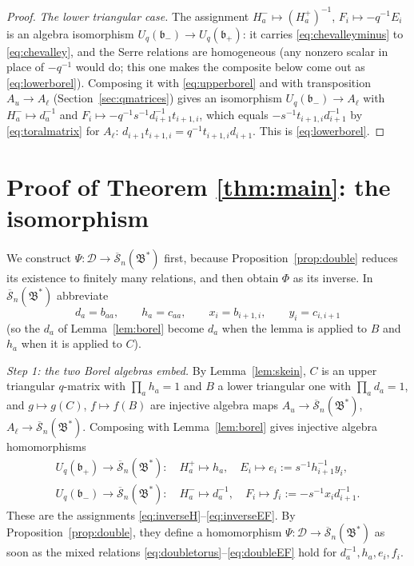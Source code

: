 \documentclass[12pt]{article}
\theoremstyle{remark}
\newcommand{\U}{U_q}
\newcommand{\bp}{\mathfrak b_+}
\newcommand{\bm}{\mathfrak b_-}
\newcommand{\redS}{\overline{\mathcal S}_n}
\newcommand{\Bstar}{\mathfrak B^*}
\newcommand{\cD}{\mathcal D}
\begin{document}
\begin{proof}
\emph{The lower triangular case.} The assignment
$H^-_a\mapsto(H^+_a)^{-1}$, $F_i\mapsto-q^{-1}E_i$
is an algebra isomorphism $\U(\bm)\to\U(\bp)$: it carries
\eqref{eq:chevalleyminus} to \eqref{eq:chevalley}, and the Serre
relations are homogeneous (any nonzero scalar in place of $-q^{-1}$
would do; this one makes the composite below come out as
\eqref{eq:lowerborel}). Composing it with \eqref{eq:upperborel} and
with transposition $A_u\to A_\ell$ (Section~\ref{sec:qmatrices}) gives
an isomorphism $\U(\bm)\to A_\ell$ with $H^-_a\mapsto d_a^{-1}$ and
$F_i\mapsto-q^{-1}s^{-1}d_{i+1}^{-1}t_{i+1,i}$, which equals
$-s^{-1}t_{i+1,i}d_{i+1}^{-1}$ by \eqref{eq:toralmatrix} for $A_\ell$:
$d_{i+1}t_{i+1,i}=q^{-1}t_{i+1,i}d_{i+1}$. This is
\eqref{eq:lowerborel}.
\end{proof}

\section{Proof of Theorem \ref{thm:main}: the isomorphism}\label{sec:proof}

We construct $\Psi:\cD\to\redS(\Bstar)$ first, because
Proposition~\ref{prop:double} reduces its existence to finitely many
relations, and then obtain $\Phi$ as its inverse. In $\redS(\Bstar)$
abbreviate
\[
 d_a=b_{aa},\qquad h_a=c_{aa},\qquad
 x_i=b_{i+1,i},\qquad y_i=c_{i,i+1}
\]
(so the $d_a$ of Lemma~\ref{lem:borel} become $d_a$ when the lemma is
applied to $B$ and $h_a$ when it is applied to $C$).

\emph{Step 1: the two Borel algebras embed.} By Lemma~\ref{lem:skein},
$C$ is an upper triangular $q$-matrix with $\prod_ah_a=1$ and $B$ a
lower triangular one with $\prod_ad_a=1$, and $g\mapsto g(C)$,
$f\mapsto f(B)$ are injective algebra maps $A_u\to\redS(\Bstar)$,
$A_\ell\to\redS(\Bstar)$. Composing with Lemma~\ref{lem:borel} gives
injective algebra homomorphisms
\begin{gather*}
 \U(\bp)\to\redS(\Bstar):\quad H^+_a\mapsto h_a,\quad
 E_i\mapsto e_i:=s^{-1}h_{i+1}^{-1}y_i,\\
 \U(\bm)\to\redS(\Bstar):\quad H^-_a\mapsto d_a^{-1},\quad
 F_i\mapsto f_i:=-s^{-1}x_id_{i+1}^{-1}.
\end{gather*}
These are the assignments \eqref{eq:inverseH}--\eqref{eq:inverseEF}.
By Proposition~\ref{prop:double}, they define a homomorphism
$\Psi:\cD\to\redS(\Bstar)$ as soon as the mixed relations
\eqref{eq:doubletorus}--\eqref{eq:doubleEF} hold for
$d_a^{-1},h_a,e_i,f_i$.
\end{document}
